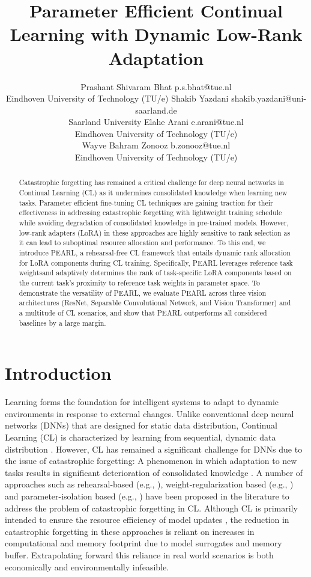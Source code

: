 \documentclass[10pt]{article} %
\title{Parameter Efficient Continual Learning with Dynamic Low-Rank Adaptation}
\author{\name Prashant Shivaram Bhat \email p.s.bhat@tue.nl \\
      \addr Eindhoven University of Technology (TU/e)
      \AND
      \name Shakib Yazdani \email shakib.yazdani@uni-saarland.de \\
      \addr Saarland University
      \AND
      \name Elahe Arani \email e.arani@tue.nl\\
      \addr Eindhoven University of Technology (TU/e) \\
      Wayve 
      \AND
     \name Bahram Zonooz \email b.zonooz@tue.nl\\
      \addr Eindhoven University of Technology (TU/e) 
      }
\begin{document}
\maketitle

\begin{abstract}
  Catastrophic forgetting has remained a critical challenge for deep neural networks in Continual Learning (CL) as it undermines consolidated knowledge when learning new tasks. Parameter efficient fine-tuning CL techniques are gaining traction for their effectiveness in addressing catastrophic  forgetting with lightweight training schedule while avoiding degradation of consolidated knowledge in pre-trained models. However, low-rank adapters (LoRA) in these approaches are highly sensitive to rank selection as it can lead to suboptimal resource allocation and performance. To this end, we introduce PEARL, a rehearsal-free CL framework that entails dynamic rank allocation for LoRA components during CL training. Specifically, PEARL leverages reference task weights\footnotemark[2] and adaptively determines the rank of task-specific LoRA components based on the current task's proximity to reference task weights in parameter space. To demonstrate the versatility of PEARL, we evaluate PEARL across three vision architectures (ResNet, Separable Convolutional Network, and Vision Transformer) and a multitude of CL scenarios, and show that PEARL outperforms all considered baselines by a large margin. 
\end{abstract}

\section{Introduction}

Learning forms the foundation for intelligent systems to adapt to dynamic environments in response to external changes. Unlike conventional deep neural networks (DNNs) that are designed for static data distribution, Continual Learning (CL) is characterized by learning from sequential, dynamic data distribution \citep{wang2023comprehensive}.  However, CL has remained a significant challenge for DNNs due to the issue of catastrophic forgetting: A phenomenon in which adaptation to new tasks results in significant deterioration of consolidated knowledge \citep{masana2022class, de2021continual, ditzler2015learning, robins1995}. A number of approaches such as rehearsal-based (e.g., \citet{buzzega2020dark}), weight-regularization based (e.g., \citet{kirkpatrick2017overcoming}) and parameter-isolation based (e.g., \citet{rusu2016progressive}) have been proposed in the literature to address the problem of catastrophic forgetting in CL. Although CL is primarily intended to ensure the resource efficiency of model updates \citep{wang2023comprehensive}, the reduction in catastrophic forgetting in these approaches is reliant on increases in computational and memory footprint due to model surrogates and memory buffer. Extrapolating forward this reliance in real world scenarios is both economically and environmentally infeasible. 
\end{document}
